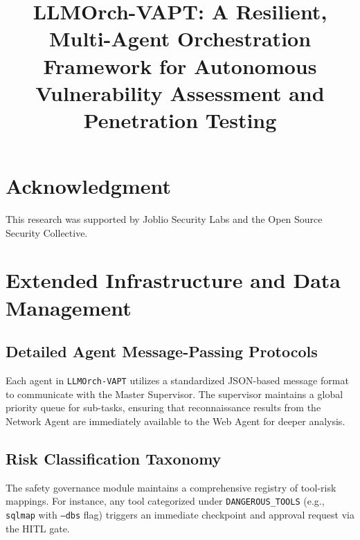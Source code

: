 \documentclass[conference,compsoc]{IEEEtran}
\begin{document}
\title{LLMOrch-VAPT: A Resilient, Multi-Agent Orchestration Framework for Autonomous Vulnerability Assessment and Penetration Testing}

\author{
}

\maketitle









\section*{Acknowledgment}
This research was supported by Joblio Security Labs and the Open Source Security Collective.




\appendix
\section{Extended Infrastructure and Data Management}
\subsection{Detailed Agent Message-Passing Protocols}
Each agent in \texttt{LLMOrch-VAPT} utilizes a standardized JSON-based message format to communicate with the Master Supervisor. The supervisor maintains a global priority queue for sub-tasks, ensuring that reconnaissance results from the Network Agent are immediately available to the Web Agent for deeper analysis.

\subsection{Risk Classification Taxonomy}
The safety governance module maintains a comprehensive registry of tool-risk mappings. For instance, any tool categorized under \texttt{DANGEROUS\_TOOLS} (e.g., \texttt{sqlmap} with \texttt{--dbs} flag) triggers an immediate checkpoint and approval request via the HITL gate.
\end{document}
